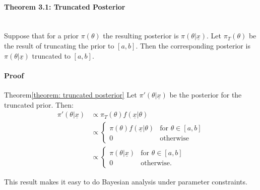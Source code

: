 \paragraph{Theorem 3.1: Truncated Posterior}{\label{theorem: truncated posterior} ~\\ 
Suppose that for a prior $\pi(\theta)$ the resulting posterior is $\pi(\theta | \underline{x})$.
Let $\pi_T(\theta)$ be the result of truncating the prior to $[a,b]$.
Then the corresponding posterior is $\pi(\theta | \underline{x})$ truncated to $[a,b]$.
\paragraph{Proof}{Theorem}{\ref{theorem: truncated posterior}}
Let $\pi'(\theta | \underline{x})$ be the posterior for the truncated prior. Then:
\begin{align*}
\pi'(\theta | \underline{x}) &\propto \pi_T(\theta) f(\underline{x}|\theta) \\
& \propto
\begin{cases}
  \pi(\theta) f(\underline{x}|\theta) & \text{for } \theta \in [a,b] \\
  0 & \text{otherwise}
\end{cases} \\
& \propto
\begin{cases}
  \pi(\theta | \underline{x}) & \text{for } \theta \in [a,b] \\
  0 & \text{otherwise}.
\end{cases}
\end{align*}

This result makes it easy to do Bayesian analysis under parameter constraints.}


















\clearpage
